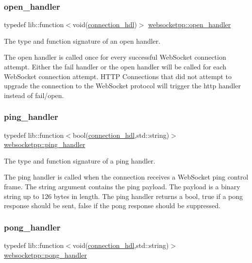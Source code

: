\subsubsection{\texorpdfstring{open\+\_\+handler}{open\_handler}}
{\footnotesize\ttfamily typedef lib\+::function$<$void(\mbox{\hyperlink{namespacewebsocketpp_a6b3d26a10ee7229b84b776786332631d}{connection\+\_\+hdl}})$>$ \mbox{\hyperlink{namespacewebsocketpp_a53c8b4ae59cf13b5f883b119bbd14d72}{websocketpp\+::open\+\_\+handler}}}



The type and function signature of an open handler. 

The open handler is called once for every successful Web\+Socket connection attempt. Either the fail handler or the open handler will be called for each Web\+Socket connection attempt. H\+T\+TP Connections that did not attempt to upgrade the connection to the Web\+Socket protocol will trigger the http handler instead of fail/open. \mbox{\label{namespacewebsocketpp_a9dcaaa7370865f1bcacb55ae715793ef}} 
\subsubsection{\texorpdfstring{ping\+\_\+handler}{ping\_handler}}
{\footnotesize\ttfamily typedef lib\+::function$<$bool(\mbox{\hyperlink{namespacewebsocketpp_a6b3d26a10ee7229b84b776786332631d}{connection\+\_\+hdl}},std\+::string)$>$ \mbox{\hyperlink{namespacewebsocketpp_a9dcaaa7370865f1bcacb55ae715793ef}{websocketpp\+::ping\+\_\+handler}}}



The type and function signature of a ping handler. 

The ping handler is called when the connection receives a Web\+Socket ping control frame. The string argument contains the ping payload. The payload is a binary string up to 126 bytes in length. The ping handler returns a bool, true if a pong response should be sent, false if the pong response should be suppressed. \mbox{\label{namespacewebsocketpp_a1798d54e6d98a481cf870091af84bc1f}} 
\subsubsection{\texorpdfstring{pong\+\_\+handler}{pong\_handler}}
{\footnotesize\ttfamily typedef lib\+::function$<$void(\mbox{\hyperlink{namespacewebsocketpp_a6b3d26a10ee7229b84b776786332631d}{connection\+\_\+hdl}},std\+::string)$>$ \mbox{\hyperlink{namespacewebsocketpp_a1798d54e6d98a481cf870091af84bc1f}{websocketpp\+::pong\+\_\+handler}}}




